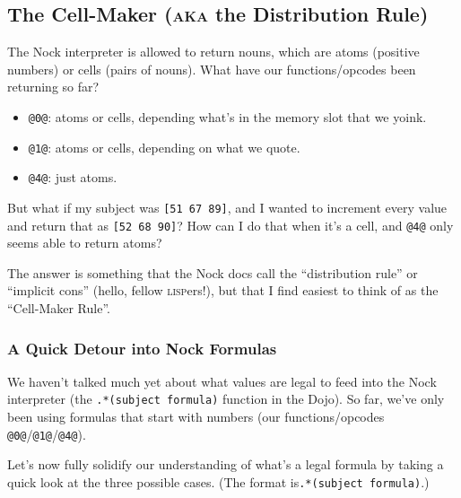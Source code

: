 \documentclass[twoside]{article}
\begin{document}
\subsection{The Cell-Maker (\textsc{aka} the Distribution Rule)}
\label{sxn:nockdist}

The Nock interpreter is allowed to return nouns, which are atoms (positive numbers) or cells (pairs of nouns). What have our functions/opcodes been returning so far?

\begin{itemize}
  \item  \lstinline[style=inlinecode]{@0@}: atoms or cells, depending what's in the memory slot that we yoink.
  \item  \lstinline[style=inlinecode]{@1@}: atoms or cells, depending on what we quote.
  \item  \lstinline[style=inlinecode]{@4@}: just atoms.
\end{itemize}

But what if my subject was \lstinline[style=inlinecode]{[51 67 89]}, and I wanted to increment every value and return that as \lstinline[style=inlinecode]{[52 68 90]}? How can I do that when it's a cell, and \lstinline[style=inlinecode]{@4@} only seems able to return atoms?

The answer is something that the Nock docs call the “distribution rule” or “implicit cons” (hello, fellow \textsc{lisp}ers!), but that I find easiest to think of as the “Cell-Maker Rule”.

\subsubsection{A Quick Detour into Nock Formulas}

We haven't talked much yet about what values are legal to feed into the Nock interpreter (the \lstinline[style=inlinecode]{.*(subject formula)} function in the Dojo). So far, we've only been using formulas that start with numbers (our functions/opcodes \lstinline[style=inlinecode]{@0@}/\lstinline[style=inlinecode]{@1@}/\lstinline[style=inlinecode]{@4@}).

Let's now fully solidify our understanding of what's a legal formula by taking a quick look at the three possible cases. (The format is\lstinline[style=inlinecode]{.*(subject formula)}.)
\end{document}
